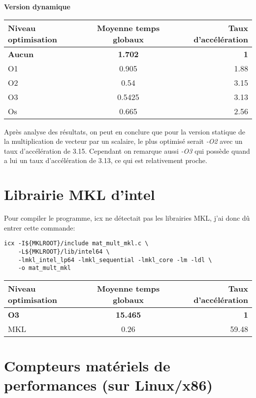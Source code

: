 \documentclass{rapport}
\begin{document}
\textbf{Version dynamique}
\begin{center}
    \begin{tabular}{ l|c|r }
        Niveau optimisation & Moyenne temps globaux & Taux d'accélération \\
        \hline
        \textbf{Aucun} & \textbf{1.702} & \textbf{1} \\
        O1 & 0.905 & 1.88 \\
        O2 & 0.54 & 3.15 \\
        O3 & 0.5425 & 3.13 \\
        Os & 0.665 & 2.56
    \end{tabular}
\end{center}
Après analyse des résultats, on peut en conclure que pour la version statique de la multiplication de vecteur par un scalaire, le plus optimisé serait \textit{-O2} avec un taux d'accélération de 3.15.
\newline Cependant on remarque aussi \textit{-O3} qui possède quand a lui un taux d'accélération de 3.13, ce qui est relativement proche.



\section{Librairie MKL d'intel}
Pour compiler le programme, icx ne détectait pas les librairies MKL, j'ai donc dû entrer cette commande:
\begin{lstlisting}
icx -I${MKLROOT}/include mat_mult_mkl.c \
    -L${MKLROOT}/lib/intel64 \
    -lmkl_intel_lp64 -lmkl_sequential -lmkl_core -lm -ldl \
    -o mat_mult_mkl
\end{lstlisting}

\begin{table}[H]
\centering
    \begin{tabular}{ l|c|r }
        Niveau optimisation & Moyenne temps globaux & Taux d'accélération \\
        \hline
        \textbf{O3} & \textbf{15.465} & \textbf{1} \\
        MKL & 0.26 & 59.48 \\
    \end{tabular}
\end{table}


\section{Compteurs matériels de performances (sur Linux/x86)}
\end{document}
